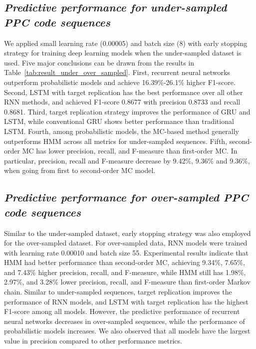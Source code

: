 \documentclass{amia_summit_2018}
\begin{document}
\subsection*{\textit{Predictive performance for under-sampled PPC code sequences}}
We applied small learning rate (0.00005) and batch size (8) with early stopping strategy for training deep learning models when the under-sampled dataset is used. Five major conclusions can be drawn
from the results in Table~\ref{tab:result_under_over_sampled}. First, recurrent neural networks outperform probabilistic models and achieve 16.39\%-26.1\% higher F1-score. Second, LSTM with
target replication has the best performance over all other RNN methods, and achieved F1-score 0.8677 with precision 0.8733 and recall 0.8681. Third, target replication strategy improves the
performance of GRU and LSTM, while conventional GRU shows better performance than traditional LSTM. Fourth, among probabilistic models, the MC-based method generally outperforms HMM across all metrics
for under-sampled sequences. Fifth, second-order MC has lower precision, recall, and F-measure than first-order MC. In particular, precision, recall and F-measure decrease by 9.42\%, 9.36\% and 
9.36\%, when going from first to second-order MC model.

\subsection*{\textit{Predictive performance for over-sampled PPC code sequences}}
Similar to the under-sampled dataset, early stopping strategy was also employed for the over-sampled dataset. For over-sampled data, RNN models were trained with learning rate 0.00010 and batch size
55. Experimental results indicate that HMM had better performance than second-order MC, achieving 9.34\%, 7.65\%, and 7.43\% higher precision, recall, and F-measure, while HMM still has 1.98\%,
2.97\%, and 3.28\% lower precision, recall, and F-measure than first-order Markov chain. Similar to under-sampled sequences, target replication improves the performance of RNN models, and LSTM with
target replication has the highest F1-score among all models. However, the predictive performance of recurrent neural networks decreases in over-sampled sequences, while the performance of
probabilistic models increases. We also observed that all models have the largest value in precision compared to other performance metrics.
\end{document}
